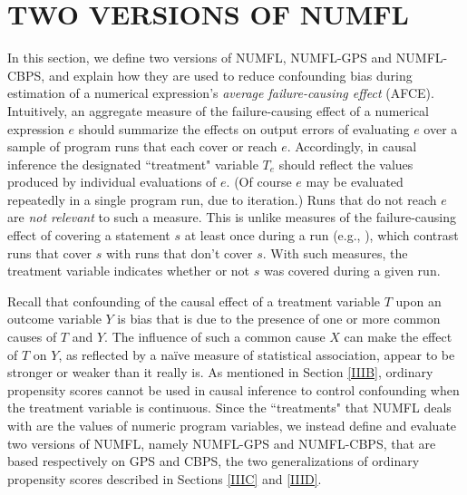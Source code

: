 \section{TWO VERSIONS OF NUMFL}\label{twoversion}
In this section, we define two versions of NUMFL, NUMFL-GPS and NUMFL-CBPS, and explain how they are used to reduce confounding bias during estimation of a numerical expression's {\it average failure-causing effect} (AFCE). Intuitively, an aggregate measure of the failure-causing effect of a numerical expression $e$ should summarize the effects on output errors of evaluating $e$ over a sample of program runs that each cover or reach $e$. Accordingly, in causal inference the designated ``treatment" variable $T_e$ should reflect the values produced by individual evaluations of $e$. (Of course $e$ may be evaluated repeatedly in a single program run, due to iteration.) Runs that do not reach $e$ are {\it not relevant} to such a measure. This is unlike measures of the failure-causing effect of covering a statement $s$ at least once during a run (e.g., \cite{Jones2002}), which contrast runs that cover $s$ with runs that don't cover $s$. With such measures, the treatment variable indicates whether or not $s$ was covered during a given run.

Recall that confounding of the causal effect of a treatment variable $T$ upon an outcome variable $Y$ is bias that is due to the presence of one or more common causes of $T$ and $Y$. The influence of such a common cause $X$ can make the effect of $T$ on $Y$, as reflected by a na\"{i}ve measure of statistical association, appear to be stronger or weaker than it really is. As mentioned in Section \ref{IIIB}, ordinary propensity scores cannot be used in causal inference to control confounding when the treatment variable is continuous.  Since the ``treatments" that NUMFL deals with are the values of numeric program variables, we instead define and evaluate two versions of NUMFL, namely NUMFL-GPS and NUMFL-CBPS, that are based respectively on GPS and CBPS, the two generalizations of ordinary propensity scores described in Sections \ref{IIIC} and \ref{IIID}.

